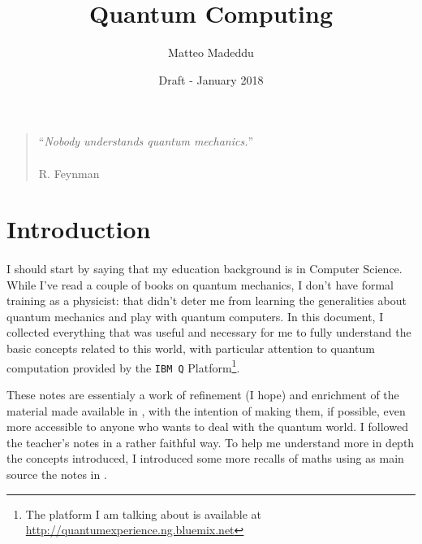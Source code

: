 \documentclass[a4paper,10pt]{article}
\title{Quantum Computing}
\author{Matteo Madeddu}
\date{Draft - January 2018}
\begin{document}
\begin{titlingpage}
\maketitle
\thispagestyle{empty}
\end{titlingpage}

\newpage
\pagestyle{empty}

\vspace*{\fill} 
\begin{quote} 
\centering 
``\textit{Nobody understands quantum mechanics.}'' \\
\ \\
R. Feynman
\end{quote}
\vspace*{\fill}

\newpage
\pagestyle{empty}

\tableofcontents

\newpage
\pagestyle{plain}

\section*{Introduction}

\paragraph{} I should start by saying that my education background is in Computer Science. While I've read a couple of books on quantum mechanics, I don't have formal training as a physicist: that didn’t deter me from learning the generalities about quantum mechanics and play with quantum computers. In this document, I collected everything that was useful and necessary for me to fully understand the basic concepts related to this world, with particular attention to quantum computation provided by the \texttt{IBM Q} Platform\footnote{The platform I am talking about is available at \url{http://quantumexperience.ng.bluemix.net}}.

These notes are essentialy a work of refinement (I hope) and enrichment of the material made available in \cite{dipierro}, with the intention of making them, if possible, even more accessible to anyone who wants to deal with the quantum world. I followed the teacher's notes in a rather faithful way. To help me understand more in depth the concepts introduced, I introduced some more recalls of maths using as main source the notes in \cite{susskind2014quantum}.
\end{document}
